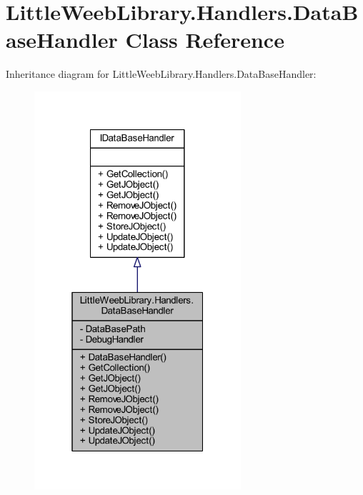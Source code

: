 \hypertarget{class_little_weeb_library_1_1_handlers_1_1_data_base_handler}{}\section{Little\+Weeb\+Library.\+Handlers.\+Data\+Base\+Handler Class Reference}
\label{class_little_weeb_library_1_1_handlers_1_1_data_base_handler}


Inheritance diagram for Little\+Weeb\+Library.\+Handlers.\+Data\+Base\+Handler\+:\nopagebreak
\begin{figure}[H]
\begin{center}
\leavevmode
\includegraphics[width=217pt]{class_little_weeb_library_1_1_handlers_1_1_data_base_handler__inherit__graph}
\end{center}
\end{figure}


